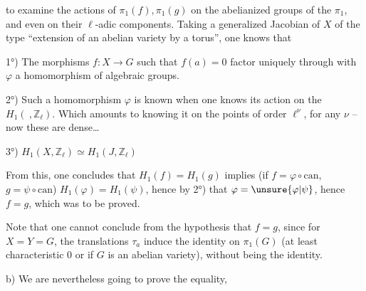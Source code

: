 to examine the actions of $\pi_1(f),\pi_1(g)$ on the abelianized groups of the $\pi_1$, and even on their $\ell$-adic components. Taking a generalized Jacobian of $X$ of the type ``extension of an abelian variety by a torus'', one knows that

1°) The morphisms $f:X\longrightarrow G$ such that $f(a)=0$ factor uniquely through
with $\varphi$ a homomorphism of algebraic groups.

2°)  Such a homomorphism $\varphi$ is known when one knows its action on the $H_1(\ ,\mathbb Z_\ell)$. Which amounts to knowing it on the points of order $\ell^\nu$, for any $\nu$ -- now these are dense\ldots

3°) $H_1(X,\mathbb Z_\ell)\simeq H_1(J,\mathbb Z_\ell)$

From this,  one concludes  that $H_1(f)=H_1(g)$ implies (if $f=\varphi\circ\mathrm{can}$, $g=\psi\circ\mathrm{can}$) $H_1(\varphi)=H_1(\psi)$, hence by 2°) that $\varphi=\unsure{\varphi|\psi}$, hence $f=g$, which was to be proved.

 Note that one cannot conclude from the hypothesis  that $f=g$, since for $X=Y=G$, the translations $\tau_a$ induce the identity on $\pi_1(G)$ (at least  characteristic $0$ or if $G$ is an abelian variety), without being the identity.

b) We are nevertheless going to prove the equality,
